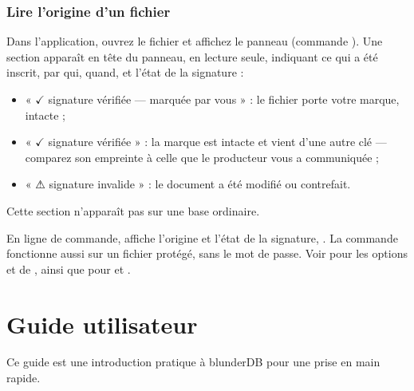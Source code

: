 \documentclass[letterpaper,10pt,french]{sphinxmanual}
\begin{document}
\subsubsection{Lire l’origine d’un fichier}
\label{\detokenize{manuel:lire-l-origine-d-un-fichier}}
\sphinxAtStartPar
Dans l’application, ouvrez le fichier et affichez le panneau 
(commande ). Une section  apparaît en tête du panneau, en
lecture seule, indiquant ce qui a été inscrit, par qui, quand, et l’état de la
signature :
\begin{itemize}
\item {} 
\sphinxAtStartPar
« \(\checkmark\) signature vérifiée — marquée par vous » : le fichier porte votre marque,
intacte ;

\item {} 
\sphinxAtStartPar
« \(\checkmark\) signature vérifiée » : la marque est intacte et vient d’une autre clé —
comparez son empreinte à celle que le producteur vous a communiquée ;

\item {} 
\sphinxAtStartPar
« ⚠ signature invalide » : le document a été modifié ou contrefait.

\end{itemize}

\sphinxAtStartPar
Cette section n’apparaît pas sur une base ordinaire.

\sphinxAtStartPar
En ligne de commande,  affiche l’origine et
l’état de la signature, . La commande
fonctionne aussi sur un fichier protégé, sans le mot de passe. Voir
 pour les options  et  de
, ainsi que pour  et .

\sphinxstepscope


\section{Guide utilisateur}
\label{\detokenize{guide_utilisateur:guide-utilisateur}}\label{\detokenize{guide_utilisateur:id1}}\label{\detokenize{guide_utilisateur::doc}}
\sphinxAtStartPar
Ce guide est une introduction pratique à blunderDB pour une prise en main
rapide.
\end{document}
